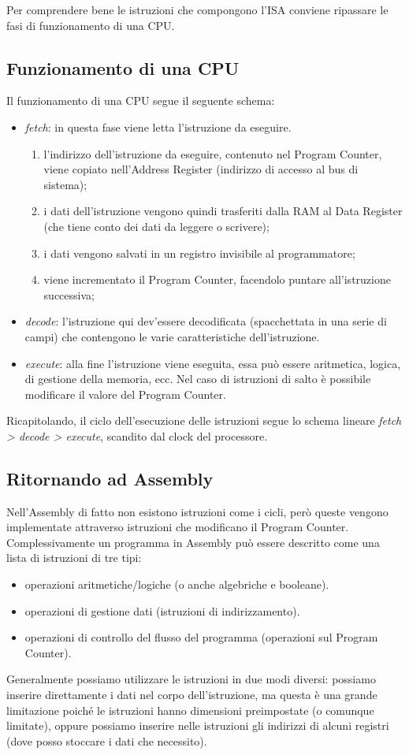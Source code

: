 \documentclass[class=book, crop=false, oneside]{standalone}
\begin{document}
Per comprendere bene le istruzioni che compongono l'ISA conviene ripassare le fasi di funzionamento di una CPU.

\subsection{Funzionamento di una CPU}\label{subsec:cpu}
Il funzionamento di una CPU segue il seguente schema:
\begin{itemize}
	\item \emph{fetch}: in questa fase viene letta l'istruzione da eseguire.
	\begin{enumerate}
		\item l'indirizzo dell'istruzione da eseguire, contenuto nel Program Counter, viene copiato nell'Address Register (indirizzo di accesso al bus di sistema);
		\item i dati dell'istruzione vengono quindi trasferiti dalla RAM al Data Register (che tiene conto dei dati da leggere o scrivere);
		\item i dati vengono salvati in un registro invisibile al programmatore;
		\item viene incrementato il Program Counter, facendolo puntare all'istruzione successiva;
	\end{enumerate}
	\item \emph{decode}: l’istruzione qui dev’essere decodificata (spacchettata in una serie di campi) che contengono le varie caratteristiche dell’istruzione.
	\item \emph{execute}: alla fine l’istruzione viene eseguita, essa può essere aritmetica, logica, di gestione della memoria, ecc. Nel caso di istruzioni di salto è possibile modificare il valore del Program Counter.
\end{itemize}
Ricapitolando, il ciclo dell’esecuzione delle istruzioni segue lo schema lineare \emph{fetch > decode > execute}, scandito dal clock del processore.

\subsection*{Ritornando ad Assembly}
Nell’Assembly di fatto non esistono istruzioni come i cicli, però queste vengono implementate attraverso istruzioni che modificano il Program Counter.
Complessivamente un programma in Assembly può essere descritto come una lista di istruzioni di tre tipi:
\begin{itemize}[noitemsep]
	\item operazioni aritmetiche/logiche (o anche algebriche e booleane).
	\item operazioni di gestione dati (istruzioni di indirizzamento).
	\item operazioni di controllo del flusso del programma (operazioni sul Program Counter).
\end{itemize}
Generalmente possiamo utilizzare le istruzioni in due modi diversi: possiamo inserire direttamente i dati nel corpo dell'istruzione, ma questa è una grande limitazione poiché le istruzioni hanno dimensioni preimpostate (o comunque limitate), oppure possiamo inserire nelle istruzioni gli indirizzi di alcuni registri (dove posso stoccare i dati che necessito).
\end{document}
